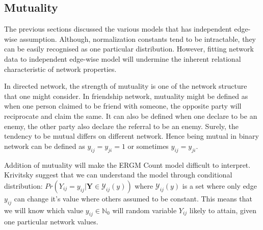 \documentclass[12pt,a4paper,twoside,openany]{book}\usepackage[]{graphicx}\usepackage[]{color}
\begin{document}
\subsection{Mutuality}
The previous sections discussed the various models that has independent edge-wise assumption. Although, normalization constants tend to be intractable, they can be easily recognised as one particular distribution. However, fitting network data to independent edge-wise model will undermine the inherent relational characteristic of network properties. 

In directed network, the strength of mutuality is one of the network structure that one might consider. In friendship network, mutuality might be defined as when one person claimed to be friend with someone, the opposite party will reciprocate and claim the same. It can also be defined when one declare to be an enemy, the other party also declare the referral to be an enemy. Surely, the tendency to be mutual differs on different network. Hence being mutual in binary network can be defined as $y_{ij}=y_{ji}=1$ or sometimes $y_{ij}=y_{ji}$.

Addition of mutuality will make the ERGM Count model difficult to interpret. Krivitsky suggest that we can understand the model through conditional distribution:
$Pr(Y_{ij}=y_{ij}| \bm{Y} \in \mathcal{Y}_{ij}(y))$ where 
$\mathcal{Y}_{ij}(y)$ is a set where only edge $y_{ij}$ can change it's value where others assumed to be constant.
This means that we will know which value $y_{ij} \in \mathbb{N}_0$ will random variable $Y_{ij}$ likely to attain, given one particular network values. 
\end{document}
